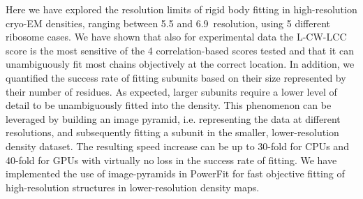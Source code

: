 
Here we have explored the resolution limits of rigid body fitting in
high-resolution cryo-EM densities, ranging between 5.5 and 6.9\Angstrom\ 
resolution, using 5 different ribosome cases. We have shown that also for
experimental data the L-CW-LCC score is the most sensitive of the 4
correlation-based scores tested and that it can unambiguously fit most chains
objectively at the correct location. In addition, we quantified the success
rate of fitting subunits based on their size represented by their number of
residues. As expected, larger subunits require a lower level of detail to be
unambiguously fitted into the density. This phenomenon can be leveraged by
building an image pyramid, i.e.  representing the data at different
resolutions, and subsequently fitting a subunit in the smaller,
lower-resolution density dataset. The resulting speed increase can be up to
30-fold for CPUs and 40-fold for GPUs with virtually no loss in the success
rate of fitting. We have implemented the use of image-pyramids in PowerFit for
fast objective fitting of high-resolution structures in lower-resolution
density maps. 

